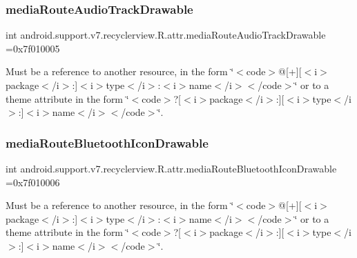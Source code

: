 \subsubsection{\texorpdfstring{media\+Route\+Audio\+Track\+Drawable}{mediaRouteAudioTrackDrawable}}
{\footnotesize\ttfamily int android.\+support.\+v7.\+recyclerview.\+R.\+attr.\+media\+Route\+Audio\+Track\+Drawable =0x7f010005\hspace{0.3cm}{\ttfamily [static]}}

Must be a reference to another resource, in the form \char`\"{}$<$code$>$@\mbox{[}+\mbox{]}\mbox{[}$<$i$>$package$<$/i$>$\+:\mbox{]}$<$i$>$type$<$/i$>$\+:$<$i$>$name$<$/i$>$$<$/code$>$\char`\"{} or to a theme attribute in the form \char`\"{}$<$code$>$?\mbox{[}$<$i$>$package$<$/i$>$\+:\mbox{]}\mbox{[}$<$i$>$type$<$/i$>$\+:\mbox{]}$<$i$>$name$<$/i$>$$<$/code$>$\char`\"{}. \mbox{\label{classandroid_1_1support_1_1v7_1_1recyclerview_1_1R_1_1attr_a1ec897bb4878a970403311bc5070f5e9}} 
\subsubsection{\texorpdfstring{media\+Route\+Bluetooth\+Icon\+Drawable}{mediaRouteBluetoothIconDrawable}}
{\footnotesize\ttfamily int android.\+support.\+v7.\+recyclerview.\+R.\+attr.\+media\+Route\+Bluetooth\+Icon\+Drawable =0x7f010006\hspace{0.3cm}{\ttfamily [static]}}

Must be a reference to another resource, in the form \char`\"{}$<$code$>$@\mbox{[}+\mbox{]}\mbox{[}$<$i$>$package$<$/i$>$\+:\mbox{]}$<$i$>$type$<$/i$>$\+:$<$i$>$name$<$/i$>$$<$/code$>$\char`\"{} or to a theme attribute in the form \char`\"{}$<$code$>$?\mbox{[}$<$i$>$package$<$/i$>$\+:\mbox{]}\mbox{[}$<$i$>$type$<$/i$>$\+:\mbox{]}$<$i$>$name$<$/i$>$$<$/code$>$\char`\"{}. \mbox{\label{classandroid_1_1support_1_1v7_1_1recyclerview_1_1R_1_1attr_a360e6f13a54781f28055d554369e429e}} 
